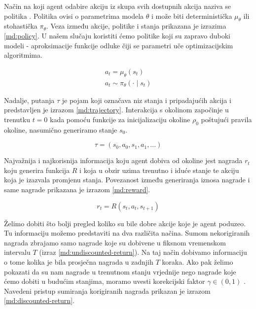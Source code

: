 Način na koji agent odabire akciju iz skupa svih dostupnih akcija naziva se politika . Politika ovisi o parametrima modela $\theta$ i može biti deterministička $\mu_{\theta}$ ili stohastička $\pi_{\theta}$. Veza između akcije, politike i stanja prikazana je izrazima \ref{md:policy}. U našem slučaju koristiti ćemo politike koji su zapravo duboki modeli - aproksimacije funkcije odluke čiji se parametri uče optimizacijskim algoritmima.  

\begin{equation}
    \begin{gathered}
    \label{md:policy}
    a_t = \mu_{\theta}(s_t) \\
    a_t \sim \pi_{\theta}(\cdot \mid s_t)
    \end{gathered}
\end{equation}

Nadalje, putanja $\tau$  je pojam koji označava niz stanja i pripadajućih akcija i predstavljen je izrazom \ref{md:trajectory}. Interakcija s okolinom započinje u trenutku $t = 0$ kada pomoću funkcije za inicijalizaciju okoline $\rho_0$ poštujući pravila okoline, nasumično generiramo stanje $s_0$.

\begin{equation}
    \label{md:trajectory}
    \tau = (s_0, a_0, s_1, a_1, ...)
\end{equation}

Najvažnija i najkorisnija informacija koju agent dobiva od okoline jest nagrada $r_t$  koju generira funkcija $R$  i koja u obzir uzima trenutno i iduće stanje te akciju koja je izazvala promjenu stanja. Povezanost između generiranja iznosa nagrade i same nagrade prikazana je izrazom \ref{md:reward}.

\begin{equation}
    \label{md:reward}
    r_t = R(s_t, a_t, s_{t+1})
\end{equation}

Želimo dobiti što bolji pregled koliko su bile dobre akcije koje je agent poduzeo. Tu informaciju možemo predstaviti na dva različita načina. Sumom nekorigiranih nagrada zbrajamo samo nagrade koje su dobivene u fiksnom vremenskom intervalu $T$ (izraz \ref{md:undiscounted-return}). Na taj način dobivamo informaciju o tome kolika je bila prosječna nagrada u zadnjih $T$ koraka. Ako pak želimo pokazati da su nam nagrade u trenutnom stanju vrjednije nego nagrade koje ćemo dobiti u budućim stanjima, moramo uvesti korekcijski faktor $\gamma \in (0,1)$ . Navedeni pristup sumiranja korigiranih nagrada prikazan je izrazom \ref{md:discounted-return}.

